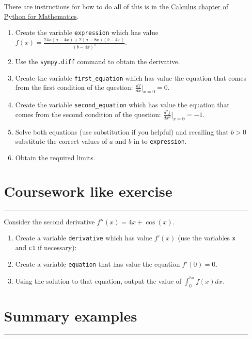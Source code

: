 \documentclass{article}
\begin{document}
There are instructions for how to do all of this is in the
\href{https://vknight.org/pfm/tools-for-mathematics/03-calculus/how/}{Calculus chapter of Python for Mathematics}.


\begin{enumerate}
\item
  Create the variable \texttt{expression} which has value
        $f(x)= \frac{24 x \left(a - 4 x\right) + 2 \left(a - 8 x\right) \left(b - 4 x\right)}{\left(b - 4 x\right)^{4}}$.
\item Use the \texttt{sympy.diff} command to obtain the
        derivative.
\item Create the variable \texttt{first_equation} which has value the
    equation that comes from the first condition of the question:
        $\frac{df}{dx}|_{x=0} = 0$.
\item Create the variable \texttt{second_equation} which has value the
    equation that comes from the second condition of the question:
        $\frac{d^2f}{dx^2}|_{x=0} = -1$.
    \item Solve both equations (use substitution if you helpful) and recalling
        that $b>0$ substitute the correct values of $a$ and $b$ in to
        \texttt{expression}.
    \item Obtain the required limits.
\end{enumerate}


\section{Coursework like exercise}
\hrule


Consider the second derivative $f''(x)=4 x + \cos(x)$.

\begin{enumerate}
    \item Create a variable \texttt{derivative} which has value 
        $f'(x)$ (use the variables \texttt{x} and
        \texttt{c1} if necessary):
    \item Create a variable \texttt{equation} that has value the 
        equation $f'(0)=0$.
    \item Using the solution to that equation, output the value of $\int_{0}^{5\pi}f(x)dx$.
\end{enumerate}

\section{Summary examples}
\hrule
\end{document}
